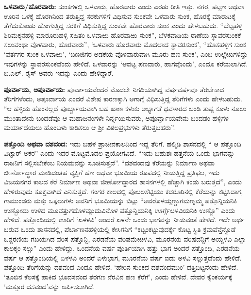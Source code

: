 \textbf{ಒಳವಾರು/ಹೊರವಾರು: } ಸುಂಕಗಳಲ್ಲಿ ಒಳವಾರು, ಹೊರವಾರು ಎಂದು ಎರಡು ರೀತಿ ಇತ್ತು. ನಗರ, ಪಟ್ಟಣ ಅಥವಾ ಊರಿನ ಒಳಕ್ಕೆ ಹೊರಗಿನಿಂದ ತರುತ್ತಿದ್ದ ಸರಕುಗಳಿಗೆ ವಿಧಿಸುವ ಸುಂಕವೇ ಒಳವಾರು ಸುಂಕ, ಹೊರಕ್ಕೆ ಮಾರಾಟಕ್ಕೆ ತೆಗೆದುಕೊಂಡು ಹೋಗುತ್ತಿದ್ದ ಸರಕಿಗೆ ವಿಧಿಸುತ್ತಿದ್ದ ಸುಂಕವೇ ಹೊರವಾರು ಸುಂಕ ಎಂದು ಹೇಳಬಹುದು. “ಬೆಟ್ಟಹಳ್ಳಿ ಶಿರಿಮಕ್ಕನಹಳ್ಳಿ ಮಾರೂರುಹಳ್ಳಿ ಸಹಿತಂ ಒಳವಾಱು ಹೊರವಾಱು ಸುಂಕ”, ಬೆಳಕವಾಡಿಯ ಠಾಣೆಯ ಸ್ಥಾವರಸುಂಕಕೆ ಸಲುವಂಥಾ ವೊಳವಾರು, ಹೊರವಾರು”, ‘ಒಳವಾರು ಹೊರವಾರು ಮೊದಲಾದ ಸ್ಥಾವರಸುಂಕ’, “ಹೊಸಹಳ್ಳಿಗ ಸುಂಕ ‘ವರ್ತಗರ ಸುಂಕ ಒಳವಾಱು’, ‘ಬಣಜಿಗರ ಅಡಕೆಯ ವೊಳವಾರುವಾಗಿ ಮೂರು ಹಣ ಸುಂಕ’, ಎಂಬ ಉಲ್ಲೇಖಗಳಿದ್ದು ಇವುಗಳನ್ನು ಸ್ಥಾವರಸುಂಕವೆಂದು ಹೇಳಿದೆ. ಒಳವಾರನ್ನು ‘ಆವಟ್ಟ ಪಣವಾರು, ಹಾಗವೊಂದು’, ಎಂದೂ ಕರೆಯಲಾಗಿದೆ. ಬಿ.ಎಲ್​. ರೈಸ್​ ಅವರು ಇದನ್ನು  ಎಂದು ಹೇಳಿದ್ದಾರೆ.

\textbf{ಪೂರ್ವಾಯ, ಅಪೂರ್ವಾಯ: } ಪೂರ್ವಾಯವೆಂದರೆ ಮೊದಲೇ ನಿಗದಿಯಾಗಿದ್ದ ವರ್ಷವರ್ಷವೂ ತೆರಬೇಕಾದ ತೆರಿಗೆಗಳೆಂದು, ಅಪೂರ್ವಾಯ ಎಂದರೆ ವಿಶೇಷ ಕಾರಣಕ್ಕಾಗಿ ಆಗಾಗ್ಗೆ ವಿಧಿಸುತ್ತಿದ್ದ ತೆರಿಗೆಗಳು ಎಂದು ಹೇಳಬಹುದು. “ಆ ಹಳ್ಳಿಯ ಹೊಂನಲ್ಲದೆ ಪೂರ್ಬ್ಬಾಯವಾಗಿ ಬಹ ಖಾಣ ಕಳುಕು ಅಭ್ಯಾಗತೆ ಧವಳಾರದ ಬಂಡಿ ತುಪ್ಪ ಕೂಳು ನೂಲು ಮುಂತಾದೇನು ಬಂದಡೆವೂ ಆ ಮಹಾಜನಂಗಳೇ ನಿರ್ನ್ನಯಿಸುವರು, ಅಪೂರ್ವ್ವಾಯವೇನು ಬಂದಡಂ ಹಳ್ಳಿಗಳ ಮರ್ಯಾದೆಯಲು ಹೊಂಬಳು ಕಾಡಿಸಲು ಆ ಶ‍್ರೀ ವಿಠಲಪ್ರಭುಗಳು ತೆರುತ್ತಬಹರು”.

\textbf{ಪತ್ತೊಂದಿ ಅಥವಾ ದಶವಂದ:} ಇದು ಬಹಳ ಪ್ರಾಚೀನಕಾಲದಿಂದ ಇದ್ದ ತೆರಿಗೆ. ಹಲ್ಮಿಡಿ ಶಾಸನದಲ್ಲಿ “ ಆ ಪತ್ತೊಂದಿ ವಿಟ್ಟಾರ್​ ಅಕರ” ಎಂದು ಇದರ ಮೊಟ್ಟಮೊದಲ ಪ್ರಯೋಗವಿದೆ. “ಇದು ಬಹುಶಃ ಹತ್ತನೆಯ ಒಂದು ಭಾಗವನ್ನು ರಾಜನಿಗೆ ಸಲ್ಲಿಸಬೇಕೆಂಬ ನಿಯಮವನ್ನು ಸೂಚಿಸುತ್ತದೆ”. “ದಶವಂದವು ಕೆರೆಯನ್ನು ನಿರ್ಮಾಣ ಅಥವಾ ಜೀರ್ಣೋದ್ಧಾರ ಮಾಡಿದಂತಹ ವ್ಯಕ್ತಿಗೆ ಹಣ ಅಥವಾ ಭೂಮಿಯ ರೂಪದಲ್ಲಿ ನೀಡುತ್ತಿದ್ದ ಪ್ರತಿಫಲ, ಇದು ವಿಜಯನಗರ ಕಾಲದ ಕೆರೆ ನಿರ್ಮಾಣ ಅಥವಾ ಜೀರ್ಣೋದ್ಧಾರದ ಶಾಸನಗಳಲ್ಲಿ ಹೆಚ್ಚಾಗಿ ಕಂಡು ಬರುತ್ತದೆ”, ಎಂದು ಹೇಳಿರುವುದು ಸೂಕ್ತವಾಗಿದೆ ಎನಿಸುತ್ತದೆ. ಗಂಗರ ಕಾಲದಲ್ಲಿ ಪೊೞಲಸೆಟ್ಟಿಯು ಕದರೂರಿನಲ್ಲಿ ಕೆರೆಯನ್ನು ಕಟ್ಟಿಸಿದಾಗ, ಗಾಮುಂಡರು ಮತ್ತು ಒಕ್ಕಲುಗಳು ಅವನಿಗೆ ಭೂಮಿಯನ್ನು ಬಿಟ್ಟು “ಅವರೊಳಯ್ಗಣ್ಡುಗಮಣ್ನಮ್ಮ ಪತ್ತೊನ್ದಿಯನಿಕಿ ಉಣ್ಬೋದು ಉಳಿದ ಮೂವತ್ತುಗದೊಳಮ್ಪುದುವಿನೊಳ ಪತ್ತೊನ್ದಿಯನಿಕ್ಕಿ ಊರ್ಗ್ಗೆೞಳವಿಯನಿಕಿ ಉಣ್ಬೊ” ಎಂದು ಹೇಳಿದೆ. ಪತ್ತೊಂದಿಯಲ್ಲಿ ಊರಿಗೆ ‘ಏಳಳವಿ’ ಅಂದರೆ ಏಳನೇ ಒಂದು ಭಾಗವನ್ನು ನೀಡುವಂತೆ ಹೇಳಿದೆ. ಇದೇ ಅರ್ಥ ಬರುವ ಒಂದು ಶಾಸನದಲ್ಲಿ, ಪೆರ್ಬಾಣನಹಳ್ಳಿಯಲ್ಲಿ ಕೇಸಿಗನಿಗೆ “ಕಟ್ಟಂಕಟ್ಟುವುದರ್ಕ್ಕೆ ಕೊಟ್ಟ ಸ್ಥಿತಿ ಕ್ರಮವೆನ್ತೆನ್ದೊಡೆ ಒನ್ದರಣಿಯ ಗಬಯಗಿದ ವರಿಸ ಪತ್ತೊನ್ದಿ, ಎರಡನೆಯ ವರಿಷಮೇೞಳವಿ, ಮೂರನೆಯ ವರಿಷದನ್ದಿಗೆ ಅಯ್ದಳವಿ ಎಲ್ಲಾ ಕಾಲಕ್ಕಂ ಸಲ್ಗು” ಎಂದು ಹೇಳಿದ್ದು, ಒಂದನೆಯ ವರ್ಷ ಪೂರ್ತಿಯಾಗಿ ಹತ್ತು ಭಾಗ ಅಂದರೆ ಪತ್ತೊಂದಿ, ಎರಡನೆಯ ವರ್ಷ ಆ ಪತ್ತೊಂದಿಯಲ್ಲಿ ಏಳಳವಿ ಅಂದರೆ ಏಳುಭಾಗ, ಮೂರನೆಯ ವರ್ಷ ಐದು ಅಳವಿ ಸಲ್ಲುತ್ತದೆಂದು ಹೇಳಿದೆ. ಪತ್ತೊಂದಿ ತೆರಿಗೆಯನ್ನು ದಶವಂದ ಎಂದೂ ಹೇಳಿದೆ. ‘ಹೇರಿನ ಸುಂಕದ ದಶವಂದಮುಂ’ ದತ್ತಿಬಿಟ್ಟನೆಂದು ಹೇಳಿದೆ. ‘ತೂಬಿನ ಕೆಲಸಕ್ಕೆ ಹಾಕಿದ ಭೂದಸವಂದ ತೆರಗಣ ನೆರವಿನ ಹಣ ಕೆರೆಗೆ’, ಎಂದು ಹೇಳಿದೆ. ದೇವರ ಕೈಂಕರ್ಯಕ್ಕೆ ‘ಮತ್ತೂರ ದಸವಂದ’ವನ್ನು ಅರ್ಪಿಸಲಾಗಿದೆ.

